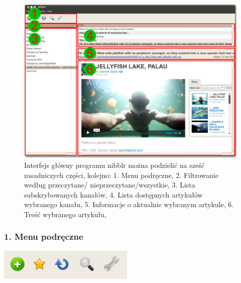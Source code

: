 \documentclass[a4paper,11pt]{report}
\begin{document}

\begin{figure}[h]
	\includegraphics[scale=0.27]{./img/nibblr1.png}
	\caption{Interfejs główny programu nibblr można podzielić na sześć 
		zasadniczych części, kolejno: 
		\newline \hspace* {1,5cm}1. Menu podręczne,
		\newline \hspace* {1,5cm}2. Filtrowanie według przeczytane/
					    nieprzeczytane/wszystkie,
		\newline \hspace* {1,5cm}3. Lista subskrybowanych kanałów,
		\newline \hspace* {1,5cm}4. Lista dostępnych artykułów
					    wybranego kanału,
		\newline \hspace* {1,5cm}5. Informacje o aktualnie wybranym
					    artykule, 
		\newline \hspace* {1,5cm}6. Treść wybranego artykułu,
	}
	\label{fig:interface6}
\end{figure}

\newpage
\subsubsection*{1. Menu podręczne}

\includegraphics[scale=0.8]{./img/menu.png}
\end{document}
